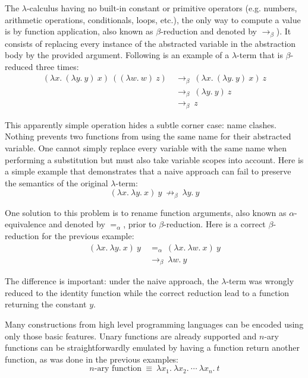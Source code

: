 The $\lambda$-calculus having no built-in constant or primitive operators (e.g. numbers, arithmetic
operations, conditionals, loops, etc.), the only way to compute a value is by function application,
also known as $\beta$-reduction and denoted by $\to_\beta$). It consists of replacing every instance
of the abstracted variable in the abstraction body by the provided argument. Following is an
example of a $\lambda$-term that is $\beta$-reduced three times:
\begin{align*}
  (\lambda x. \ (\lambda y. \ y) \ x) \ ((\lambda w. \ w) \ z)
    & \: \to_\beta \: (\lambda x. \ (\lambda y. \ y) \ x) \ z \\
    & \: \to_\beta \: (\lambda y. \ y) \ z \\
    & \: \to_\beta \: z
\end{align*}

This apparently simple operation hides a subtle corner case: name clashes. Nothing prevents two
functions from using the same name for their abstracted variable. One cannot simply replace every
variable with the same name when performing a substitution but must also take variable scopes into
account. Here is a simple example that demonstrates that a naive approach can fail to preserve the
semantics of the original $\lambda$-term:
\begin{displaymath}
  (\lambda x. \ \lambda y. \ x) \ y \: \not\to_\beta \: \lambda y. \ y
\end{displaymath}

One solution to this problem is to rename function arguments, also known as $\alpha$-equivalence and
denoted by $=_\alpha$, prior to $\beta$-reduction. Here is a correct $\beta$-reduction for the
previous example:
\begin{align*}
  (\lambda x. \ \lambda y. \ x) \ y
    & \: =_\alpha \: (\lambda x. \ \lambda w. \ x) \ y \\
    & \: \to_\beta \: \lambda w. \ y
\end{align*}

The difference is important: under the naive approach, the $\lambda$-term was wrongly reduced to the
identity function while the correct reduction lead to a function returning the constant $y$.

Many constructions from high level programming languages can be encoded using only those basic
features. Unary functions are already supported and $n$-ary functions can be straightforwardly
emulated by having a function return another function, as was done in the previous examples:
\begin{displaymath}
  n\text{-ary function} \: \equiv \: \lambda x_1. \ \lambda x_2. \ \cdots \ \lambda x_n. \ t
\end{displaymath}

